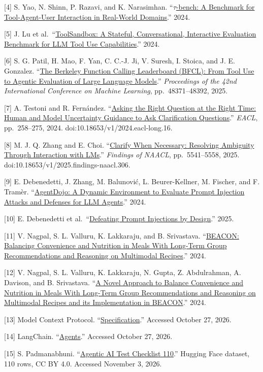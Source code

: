\documentclass[
  10pt,
  letterpaper,
]{article}
\begin{document}
{[}4{]} S. Yao, N. Shinn, P. Razavi, and K. Narasimhan.
``\href{https://arxiv.org/abs/2406.12045}{\(\tau\)-bench: A Benchmark
for Tool-Agent-User Interaction in Real-World Domains}.'' 2024.

{[}5{]} J. Lu et
al.~``\href{https://arxiv.org/abs/2408.04682}{ToolSandbox: A Stateful,
Conversational, Interactive Evaluation Benchmark for LLM Tool Use
Capabilities}.'' 2024.

{[}6{]} S. G. Patil, H. Mao, F. Yan, C. C.-J. Ji, V. Suresh, I. Stoica,
and J. E. Gonzalez.
``\href{https://proceedings.mlr.press/v267/patil25a.html}{The Berkeley
Function Calling Leaderboard (BFCL): From Tool Use to Agentic Evaluation
of Large Language Models}.'' \emph{Proceedings of the 42nd International
Conference on Machine Learning}, pp.~48371--48392, 2025.

{[}7{]} A. Testoni and R. Fernández.
``\href{https://aclanthology.org/2024.eacl-long.16/}{Asking the Right
Question at the Right Time: Human and Model Uncertainty Guidance to Ask
Clarification Questions}.'' \emph{EACL}, pp.~258--275, 2024.
doi:10.18653/v1/2024.eacl-long.16.

{[}8{]} M. J. Q. Zhang and E. Choi.
``\href{https://aclanthology.org/2025.findings-naacl.306/}{Clarify When
Necessary: Resolving Ambiguity Through Interaction with LMs}.''
\emph{Findings of NAACL}, pp.~5541--5558, 2025.
doi:10.18653/v1/2025.findings-naacl.306.

{[}9{]} E. Debenedetti, J. Zhang, M. Balunović, L. Beurer-Kellner, M.
Fischer, and F. Tramèr.
``\href{https://arxiv.org/abs/2406.13352}{AgentDojo: A Dynamic
Environment to Evaluate Prompt Injection Attacks and Defenses for LLM
Agents}.'' 2024.

{[}10{]} E. Debenedetti et
al.~``\href{https://arxiv.org/abs/2503.18813}{Defeating Prompt
Injections by Design}.'' 2025.

{[}11{]} V. Nagpal, S. L. Valluru, K. Lakkaraju, and B. Srivastava.
``\href{https://arxiv.org/abs/2406.13714}{BEACON: Balancing Convenience
and Nutrition in Meals With Long-Term Group Recommendations and
Reasoning on Multimodal Recipes}.'' 2024.

{[}12{]} V. Nagpal, S. L. Valluru, K. Lakkaraju, N. Gupta, Z.
Abdulrahman, A. Davison, and B. Srivastava.
``\href{https://arxiv.org/abs/2412.17910}{A Novel Approach to Balance
Convenience and Nutrition in Meals With Long-Term Group Recommendations
and Reasoning on Multimodal Recipes and its Implementation in BEACON}.''
2024.

{[}13{]} Model Context Protocol.
``\href{https://modelcontextprotocol.io/specification/}{Specification}.''
Accessed October 27, 2026.

{[}14{]} LangChain.
``\href{https://docs.langchain.com/oss/python/langchain/agents}{Agents}.''
Accessed October 27, 2026.

{[}15{]} S. Padmanabhuni.
``\href{https://huggingface.co/datasets/srinivaspadmanabhuni/agentic-ai-test-checklist-110}{Agentic
AI Test Checklist 110}.'' Hugging Face dataset, 110 rows, CC BY 4.0.
Accessed November 3, 2026.
\end{document}
